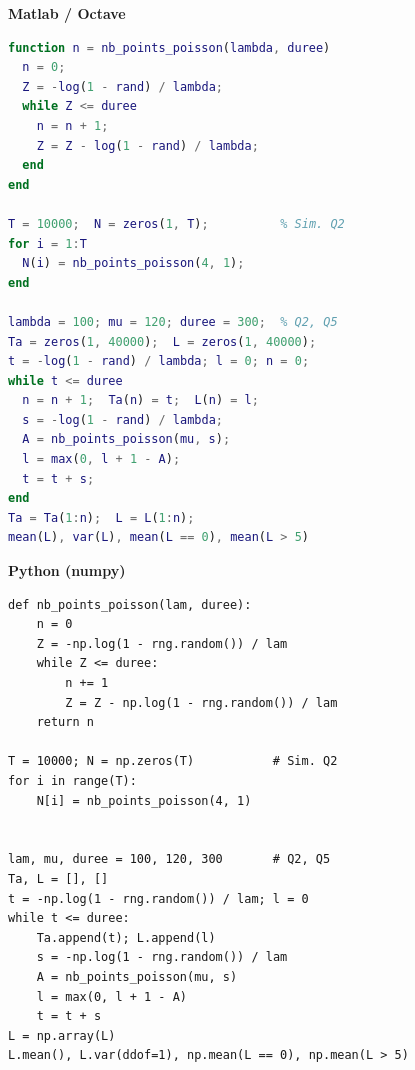 \documentclass[11pt,a4paper]{article}
\begin{document}
\noindent
\begin{minipage}[t]{0.495\linewidth}
{\small\bfseries\color{violet8}Matlab / Octave}
\begin{lstlisting}[language=Matlab,style=petit]
function n = nb_points_poisson(lambda, duree)
  n = 0;
  Z = -log(1 - rand) / lambda;
  while Z <= duree
    n = n + 1;
    Z = Z - log(1 - rand) / lambda;
  end
end

T = 10000;  N = zeros(1, T);          % Sim. Q2
for i = 1:T
  N(i) = nb_points_poisson(4, 1);
end

lambda = 100; mu = 120; duree = 300;  % Q2, Q5
Ta = zeros(1, 40000);  L = zeros(1, 40000);
t = -log(1 - rand) / lambda; l = 0; n = 0;
while t <= duree
  n = n + 1;  Ta(n) = t;  L(n) = l;
  s = -log(1 - rand) / lambda;
  A = nb_points_poisson(mu, s);
  l = max(0, l + 1 - A);
  t = t + s;
end
Ta = Ta(1:n);  L = L(1:n);
mean(L), var(L), mean(L == 0), mean(L > 5)
\end{lstlisting}
\end{minipage}\hfill
\begin{minipage}[t]{0.495\linewidth}
{\small\bfseries\color{violet8}Python (numpy)}
\begin{lstlisting}[style=petit]
def nb_points_poisson(lam, duree):
    n = 0
    Z = -np.log(1 - rng.random()) / lam
    while Z <= duree:
        n += 1
        Z = Z - np.log(1 - rng.random()) / lam
    return n

T = 10000; N = np.zeros(T)           # Sim. Q2
for i in range(T):
    N[i] = nb_points_poisson(4, 1)


lam, mu, duree = 100, 120, 300       # Q2, Q5
Ta, L = [], []
t = -np.log(1 - rng.random()) / lam; l = 0
while t <= duree:
    Ta.append(t); L.append(l)
    s = -np.log(1 - rng.random()) / lam
    A = nb_points_poisson(mu, s)
    l = max(0, l + 1 - A)
    t = t + s
L = np.array(L)
L.mean(), L.var(ddof=1), np.mean(L == 0), np.mean(L > 5)
\end{lstlisting}
\end{minipage}
\end{document}
